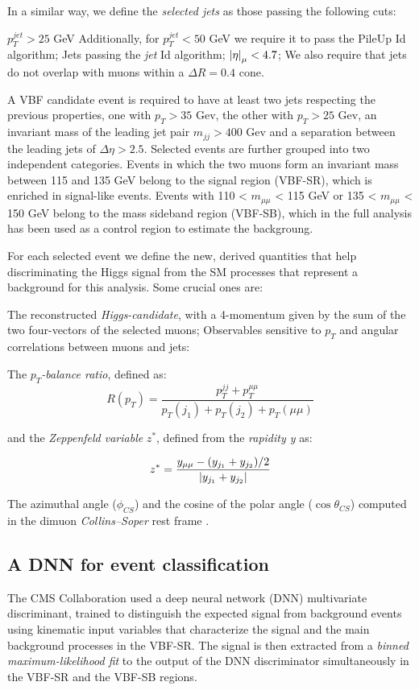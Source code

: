 In a similar way, we define the \emph{selected jets} as those passing the following cuts:

\begin{outline}
\1 $p_T^{jet}>25$ GeV 
\1 Additionally, for $p_T^{jet}<50$ GeV we require it to pass the PileUp Id algorithm;
\1  Jets passing the \emph{jet} Id algorithm;
\1  $\abs{\eta}_{\mu}<4.7$;
\1 We also require that jets do not overlap with muons within a $\Delta R=0.4$ cone.
\end{outline}

A VBF candidate event is required to have at least two jets respecting the previous properties, one with $p_T>35$ Gev, the other with $p_T>25$ Gev, an invariant mass of the leading jet pair $m_{jj}>400$ Gev and a separation between the leading jets of $\Delta\eta>2.5$. Selected events are further grouped into two independent categories. Events in which the two muons form an invariant mass between 115 and
135 GeV belong to the signal region (VBF-SR), which is enriched in signal-like events. Events with 110 < $m_{\mu\mu}$ < 115 GeV or 135 < $m_{\mu\mu}$ < 150 GeV belong to the mass sideband region (VBF-SB), which in the full analysis has been used as a control region to estimate the backgroung.

For each selected event we define the new, derived quantities that help discriminating the Higgs signal from the SM processes that represent a background for this analysis. Some crucial ones are:

\begin{outline}
\1 The reconstructed \emph{Higgs-candidate}, with a 4-momentum given by the sum of the two four-vectors of the selected muons;
\1 Observables sensitive to $p_T$ and angular correlations between muons and jets: 

The $p_T$\emph{-balance ratio}, defined as:
\[R(p_T) = \frac{p_T^{jj}+p_T^{\mu\mu}}{p_T(j_1) + p_T(j_2) + p_T(\mu\mu)}\]

and the \emph{Zeppenfeld variable} $z^*$, defined from the \emph{rapidity y} as:

\[z^* = \frac{y_{\mu\mu} - (y_{j_1} + y_{j_2})/2}{\abs{y_{j_1} + y_{j_2}}}\]

\1  The azimuthal angle ($\phi_{CS}$) and the cosine of the polar angle ($\cos\theta_{CS}$) computed in the dimuon \emph{Collins–Soper} rest frame \cite{PhysRevD.16.2219}.
\end{outline}

\subsection{A DNN for event classification}
The CMS Collaboration used a deep neural network (DNN) multivariate discriminant, trained to distinguish the expected signal from background events using kinematic input variables that characterize the signal and the main background processes in the VBF-SR. The signal is then extracted from a \emph{binned maximum-likelihood fit} to the output of the DNN discriminator simultaneously in the VBF-SR and the VBF-SB regions. 

